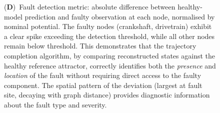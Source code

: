 \begin{figure}[!htbp]
{    (\textbf{D})~Fault detection metric: absolute difference between healthy-model prediction and faulty observation at each node, normalised by nominal potential. The faulty nodes (crankshaft, drivetrain) exhibit a clear spike exceeding the detection threshold, while all other nodes remain below threshold. This demonstrates that the trajectory completion algorithm, by comparing reconstructed states against the healthy reference attractor, correctly identifies both the \emph{presence} and \emph{location} of the fault without requiring direct access to the faulty component. The spatial pattern of the deviation (largest at fault site, decaying with graph distance) provides diagnostic information about the fault type and severity.}
    \label{fig:trajectory_fault}
\end{figure}

